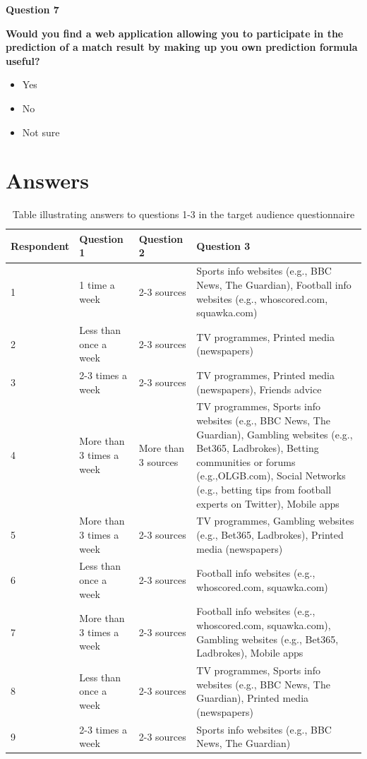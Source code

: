 \textbf{Question 7}\par
\textbf{Would you find a web application allowing you to participate in the prediction of a match result by making up you own prediction formula useful?}
\begin{itemize}
	\item Yes
	\item No
	\item Not sure
 \end{itemize}
 
\section{Answers}

\noindent
\begin{table}
\begin{tabular}{
  |p{}%
  |p{}|%
  |p{}%
  |p{}|%
  }
  \hline
  \centering Respondent  & \centering Question 1  & \centering Question 2 & \centering\arraybackslash Question 3   \\ \hline
  1 & 1 time a week & 2-3 sources & Sports info websites (e.g., BBC News, The Guardian), Football info websites (e.g., whoscored.com, squawka.com) \\ \hline
  2 & Less than once a week & 2-3 sources & TV programmes, Printed media (newspapers) \\ \hline
  3 & 2-3 times a week & 2-3 sources & TV programmes, Printed media (newspapers), Friends advice \\ \hline
  4 & More than 3 times a week & More than 3 sources & TV programmes, Sports info websites (e.g., BBC News, The Guardian), Gambling websites (e.g., Bet365, Ladbrokes), Betting communities or forums (e.g.,OLGB.com), Social Networks (e.g., betting tips from football experts on Twitter), Mobile apps \\ \hline
  5 & More than 3 times a week & 2-3 sources & TV programmes, Gambling websites (e.g., Bet365, Ladbrokes), Printed media (newspapers) \\ \hline
  6 & Less than once a week & 2-3 sources & Football info websites (e.g., whoscored.com, squawka.com) \\ \hline
  7 & More than 3 times a week & 2-3 sources & Football info websites (e.g., whoscored.com, squawka.com), Gambling websites (e.g., Bet365, Ladbrokes), Mobile apps \\ \hline
  8 & Less than once a week & 2-3 sources & TV programmes, Sports info websites (e.g., BBC News, The Guardian), Printed media (newspapers) \\ \hline
  9 & 2-3 times a week & 2-3 sources & Sports info websites (e.g., BBC News, The Guardian) \\ \hline
\end{tabular}
\\[10pt]
\caption{Table illustrating answers to questions 1-3 in the target audience questionnaire}
\end{table}

